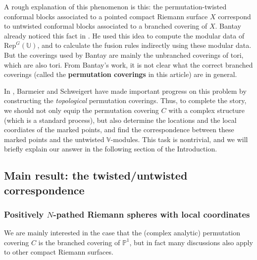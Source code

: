 \documentclass[12pt,a4paper,notitlepage]{article}
\theoremstyle{definition}
\theoremstyle{plain}
\newcommand{\Rep}{\mathrm{Rep}}
\newcommand{\Vbb}{\mathbb V}
\newcommand{\Ubb}{\mathbb U}
\newcommand{\Pbb}{\mathbb P}
\numberwithin{equation}{subsection}
\begin{document}
A rough explanation of this phenomenon is this: the permutation-twisted conformal blocks associated to a pointed compact Riemann surface $X$ correspond to untwisted conformal blocks associated to a branched covering of $X$. Bantay already noticed this fact in \cite{Ban98,Ban02}. He used this idea to compute the modular data of $\Rep^G(\Ubb)$, and to calculate the fusion rules indirectly using these modular data. But the coverings used by Bantay are mainly the unbranched coverings of tori, which are also tori. From Bantay's work, it is not clear what the correct branched coverings (called the \textbf{permutation coverings} in this article) are in general.


In \cite{BS11}, Barmeier and Schweigert have made important progress on this problem by constructing the \textit{topological} permutation coverings. Thus, to complete the story, we should not only equip the permutation covering $C$ with a complex structure (which is a standard process), but also determine the locations and the local coordiates of the marked points, and find the correspondence between these marked points and the untwisted $\Vbb$-modules. This task is nontrivial, and we will briefly explain our answer in the following section of the Introduction. 

\subsection{Main result: the twisted/untwisted correspondence}


\subsubsection*{Positively $N$-pathed Riemann spheres with local coordinates}

We are mainly interested in the case that the (complex analytic) permutation covering $C$ is the branched covering of $\Pbb^1$, but in fact many discussions also apply to other compact Riemann surfaces. 
\end{document}
